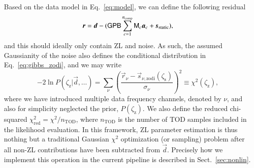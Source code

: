 \documentclass[twocolumn]{aa}
\newcommand{\dv}[0]{\vec{d}}
\newcommand{\B}[0]{\tens{B}}
\newcommand{\G}[0]{\tens{G}}
\newcommand{\s}[0]{\vec{s}}
\renewcommand{\a}[0]{\vec{a}}
\newcommand{\M}[0]{\tens{M}}
\renewcommand{\r}[0]{\vec{r}}
\renewcommand{\P}[0]{\tens{P}}
\begin{document}
Based on the data model in Eq.~\eqref{eq:model}, we can define the
following residual
\begin{equation}
\r = \dv - (\G\P\B\sum_{c=1}^{n_{\mathrm{comp}}}\M_c\a_c +
          \s_{\mathrm{static}}),
\end{equation}
and this should ideally only contain ZL and noise. As such, the
assumed Gaussianity of the noise also defines the conditional
distribution in Eq.~\eqref{eq:gibbs_zodi}, and we may write
\begin{equation}
  -2\ln P(\zeta_{\mathrm{z}}|\dv, \ldots) = \sum_{\nu}
  \left(\frac{\r_{\nu} -
    \s_{\nu,\mathrm{zodi}}(\zeta_\mathrm{s})}{\sigma_{\nu}}\right)^2 \equiv
  \chi^2 (\zeta_{\mathrm{z}}),
  \label{eq:gibbs_chisq}
\end{equation}
where we have introduced multiple data frequency channels, denoted by
$\nu$, and also for simplicity neglected the prior,
$P(\zeta_{\mathrm{z}})$. We also define the reduced chi-squared
$\chi^2_{\mathrm{red}}=\chi^2/n_{\mathrm{TOD}}$, where
$n_{\mathrm{TOD}}$ is the number of TOD samples included in the
likelihood evaluation. In this framework, ZL parameter estimation is
thus nothing but a traditional Gaussian $\chi^2$ optimization (or
sampling) problem after all non-ZL contributions have been subtracted
from $\dv$. Precisely how we implement this operation in the
current pipeline is described in Sect.~\ref{sec:nonlin}.
\end{document}

